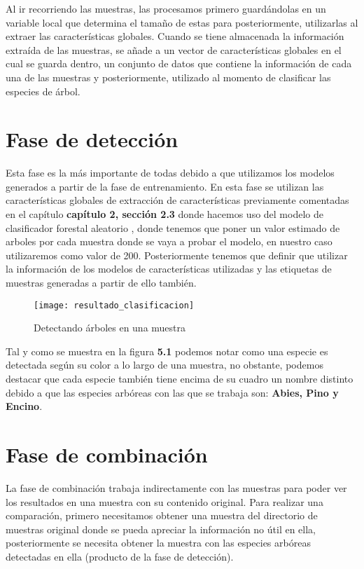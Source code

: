Al ir recorriendo las muestras, las procesamos primero guardándolas en un variable local que determina el tamaño de estas para posteriormente, utilizarlas al extraer las características globales. Cuando se tiene almacenada la información extraída de las muestras, se añade a un vector de características globales en el cual se guarda dentro, un conjunto de datos que contiene la información de cada una de las muestras y posteriormente, utilizado al momento de clasificar las especies de árbol. 

\section{Fase de detección}
Esta fase es la más importante de todas debido a que utilizamos los modelos generados a partir de la fase de entrenamiento. En esta fase se utilizan las características globales de extracción de características previamente comentadas en el capítulo \textbf{capítulo 2, sección 2.3} donde hacemos uso del modelo de clasificador forestal aleatorio , donde tenemos que poner un valor estimado de arboles por cada muestra donde se vaya a probar el modelo, en nuestro caso utilizaremos como valor de 200. Posteriormente tenemos que definir que utilizar la información de los modelos de características utilizadas y las etiquetas de muestras generadas a partir de ello también. 
\\

\begin{figure}[H]
  \centering
  \begin{minipage}[b]{0.8\textwidth}
        \texttt{[image: resultado\_clasificacion]}
    \caption{Detectando árboles en una muestra}
  \end{minipage}
\end{figure}

Tal y como se muestra en la figura \textbf{5.1}  podemos notar como una especie es detectada según su color a lo largo de una muestra, no obstante, podemos destacar que cada especie también tiene encima de su cuadro un nombre distinto debido a que las especies arbóreas con las que se trabaja son: \textbf{Abies, Pino y Encino}. 

\section{Fase de combinación}
La fase de combinación trabaja indirectamente con las muestras para poder ver los resultados en una muestra con su contenido original. Para realizar una comparación, primero necesitamos obtener una muestra del directorio de muestras original donde se pueda apreciar la información no útil en ella, posteriormente se necesita obtener la muestra con las especies arbóreas detectadas en ella (producto de la fase de detección).\\ 

